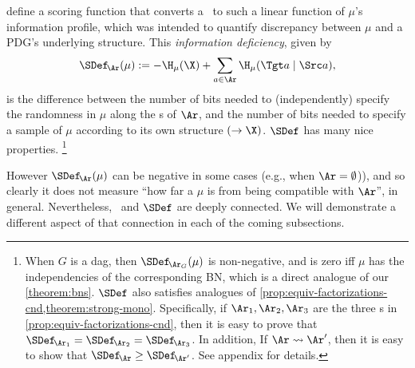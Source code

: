 { define a scoring function that converts a \hgraph\ to such a linear function of $\mu$'s information profile, which was intended to quantify discrepancy between $\mu$ and a PDG's underlying structure.
This \emph{information deficiency}, given by
\begin{equation}
    \SDef_{\!\Ar}(\mu) := - \H_\mu(\X)  + \sum_{a \in \Ar} \H_\mu(\Tgt a \mid \Src a),
\end{equation}
is the difference between the number of bits needed to (independently) specify the randomness in $\mu$ along the \arc s of $\Ar$, and the number of bits needed to specify a sample of $\mu$ according to its own structure $(\to \X)$.
$\SDef$ has many nice properties.%
\footnote{
    When $G$ is a dag, then $\SDef_{\!\Ar_G}(\mu)$
    is non-negative, and
    is zero iff $\mu$ has the independencies of the corresponding BN, 
    which is a direct
    analogue of our \cref{theorem:bns}.
    $\SDef$ also
    satisfies analogues of
    \cref{prop:equiv-factorizations-cnd,theorem:strong-mono}.%
    Specifically, if $\Ar_1, \Ar_2, \Ar_3$ are the three \hgraph s in \cref{prop:equiv-factorizations-cnd}, then it is easy to prove that $\SDef_{\!\Ar_1} = \SDef_{\!\Ar_2} = \SDef_{\!\Ar_3}$.
    In addition,
    If $\Ar \rightsquigarrow \Ar'$, then it is easy to show that $\SDef_{\!\Ar} \ge  \SDef_{\!\Ar'}$.
    See appendix for details.}

However $\SDef_{\!\Ar}(\mu)$ can be negative in some cases (e.g., when $\Ar = \emptyset$)), and so clearly it does not measure ``how far a $\mu$ is from being compatible with $\Ar$'', in general.
Nevertheless, \scibility\ and $\SDef$ are deeply connected.
We will demonstrate a different aspect of that connection in each of the coming subsections.

} %

